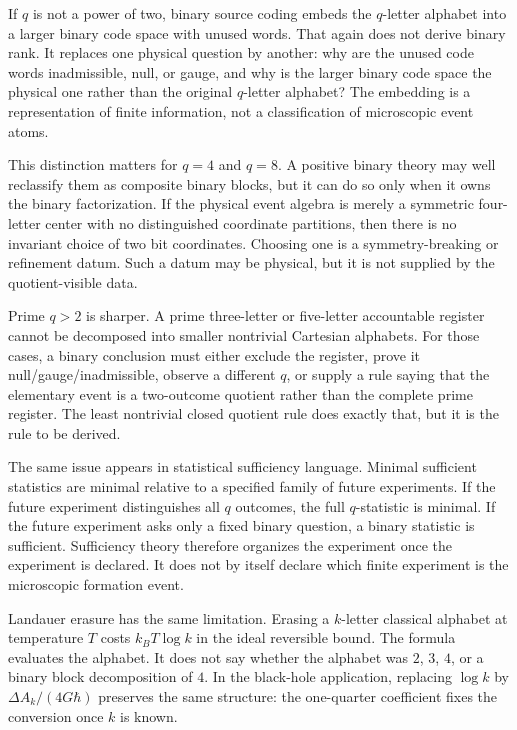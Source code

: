 \documentclass[12pt]{article}
\theoremstyle{definition}
\theoremstyle{remark}
\begin{document}
If \(q\) is not a power of two, binary source coding embeds the \(q\)-letter
alphabet into a larger binary code space with unused words.  That again does
not derive binary rank.  It replaces one physical question by another: why are
the unused code words inadmissible, null, or gauge, and why is the larger
binary code space the physical one rather than the original \(q\)-letter
alphabet?  The embedding is a representation of finite information, not a
classification of microscopic event atoms.

This distinction matters for \(q=4\) and \(q=8\).  A positive binary theory may
well reclassify them as composite binary blocks, but it can do so only when it
owns the binary factorization.  If the physical event algebra is merely a
symmetric four-letter center with no distinguished coordinate partitions, then
there is no invariant choice of two bit coordinates.  Choosing one is a
symmetry-breaking or refinement datum.  Such a datum may be physical, but it is
not supplied by the quotient-visible data.

Prime \(q>2\) is sharper.  A prime three-letter or five-letter accountable
register cannot be decomposed into smaller nontrivial Cartesian alphabets.
For those cases, a binary conclusion must either exclude the register, prove it
null/gauge/inadmissible, observe a different \(q\), or supply a rule saying
that the elementary event is a two-outcome quotient rather than the complete
prime register.  The least nontrivial closed quotient rule does exactly that,
but it is the rule to be derived.

The same issue appears in statistical sufficiency language.  Minimal
sufficient statistics are minimal relative to a specified family of future
experiments.  If the future experiment distinguishes all \(q\) outcomes, the
full \(q\)-statistic is minimal.  If the future experiment asks only a fixed
binary question, a binary statistic is sufficient.  Sufficiency theory
therefore organizes the experiment once the experiment is declared.  It does
not by itself declare which finite experiment is the microscopic formation
event.

Landauer erasure has the same limitation.  Erasing a \(k\)-letter classical
alphabet at temperature \(T\) costs \(k_B T\log k\) in the ideal reversible
bound.  The formula evaluates the alphabet.  It does not say whether the
alphabet was \(2\), \(3\), \(4\), or a binary block decomposition of \(4\).  In
the black-hole application, replacing \(\log k\) by
\(\Delta A_k/(4G\hbar)\) preserves the same structure: the one-quarter
coefficient fixes the conversion once \(k\) is known.
\end{document}
